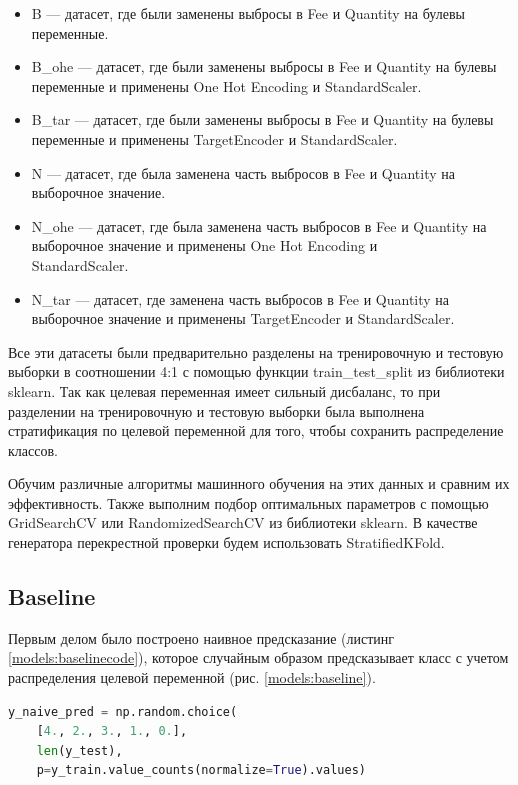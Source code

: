 \documentclass[14pt]{mmcs_article}
\begin{document}
\begin{itemize}
	\item B --- датасет, где были заменены выбросы в Fee и Quantity на булевы переменные.
	\item B\_ohe --- датасет, где были заменены выбросы в Fee и Quantity на булевы переменные и применены One Hot Encoding и StandardScaler.
	\item B\_tar --- датасет, где были заменены выбросы в Fee и Quantity на булевы переменные и применены TargetEncoder и StandardScaler.
	\item N — датасет, где была заменена часть выбросов в Fee и Quantity на выборочное значение. 
	\item N\_ohe --- датасет, где была заменена часть выбросов в Fee и Quantity на выборочное значение и применены One Hot Encoding и \\ StandardScaler.
	\item N\_tar --- датасет, где заменена часть выбросов в Fee и Quantity на выборочное значение и применены TargetEncoder и StandardScaler.
\end{itemize}

Все эти датасеты были предварительно разделены на тренировочную и тестовую выборки в соотношении 4:1 с помощью функции train\_test\_split из библиотеки sklearn. Так как целевая переменная имеет сильный дисбаланс, то при разделении на тренировочную и тестовую выборки была выполнена стратификация по целевой переменной для того, чтобы сохранить распределение классов.

Обучим различные алгоритмы машинного обучения на этих данных и сравним их эффективность. Также выполним подбор оптимальных параметров с помощью GridSearchCV или RandomizedSearchCV из библиотеки sklearn. В качестве генератора перекрестной проверки будем использовать StratifiedKFold.


\subsection{Baseline}

Первым делом было построено наивное предсказание (листинг \ref{models:baselinecode}), которое случайным образом предсказывает класс с учетом распределения целевой переменной (рис. \ref{models:baseline}).

\begin{lstlisting}[language=Python, caption={Python, создание baseline}, label=models:baselinecode]
y_naive_pred = np.random.choice(
	[4., 2., 3., 1., 0.], 
	len(y_test), 
	p=y_train.value_counts(normalize=True).values)
\end{lstlisting}
\end{document}
